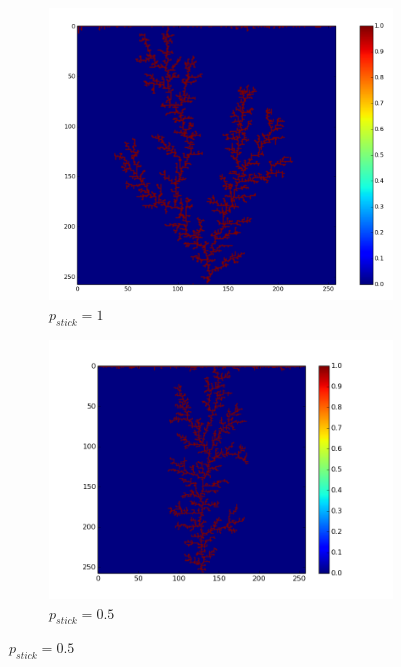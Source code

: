 \documentclass[a4paper]{article}
\begin{document}
\begin{figure}
 \begin{subfigure}[b]{0.5\linewidth}
    \centering
    \includegraphics[width=\linewidth, trim={0cm 0cm 0cm 0cm},clip]{mcDLA_10.png} 
    \caption{$p_{stick} = 1$} 
    \label{fig:mcDLA_10} 
  \end{subfigure}%
  \begin{subfigure}[b]{0.5\linewidth}
    \centering
    \includegraphics[width=\linewidth, trim={1cm 0.9cm 3.07cm 0cm},clip]{mcDLA_05.png}
    \caption{$p_{stick} = 0.5$} 
    \label{fig:mcDLA_05} 
  \end{subfigure}

\end{figure}
\end{document}
